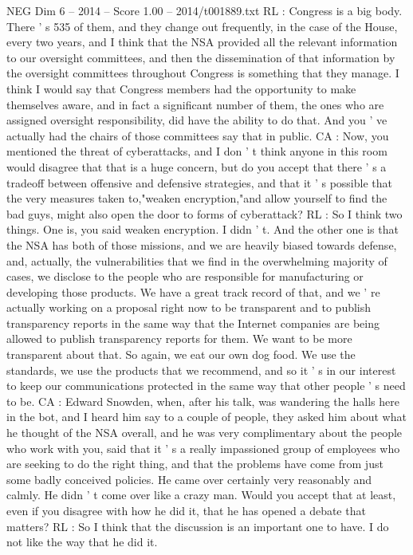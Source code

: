 \begin{textsample}{NEG Dim 6 – 2014 – Score 1.00 – 2014/t001889.txt}
RL : Congress is a big body.
There ' s 535 of them, and they change out frequently, in the case of the House, every two years, and I think that the NSA provided all the relevant information to our oversight committees, and then the dissemination of that information by the oversight committees throughout Congress is something that they manage.
I think I would say that Congress members had the opportunity to make themselves aware, and in fact a significant number of them, the ones who are assigned oversight responsibility, did have the ability to do that.
And you ' ve actually had the chairs of those committees say that in public.
CA : Now, you mentioned the threat of cyberattacks, and I don ' t think anyone in this room would disagree that that is a huge concern, but do you accept that there ' s a tradeoff between offensive and defensive strategies, and that it ' s possible that the very measures taken to,"weaken encryption,"and allow yourself to find the bad guys, might also open the door to forms of cyberattack?
RL : So I think two things.
One is, you said weaken encryption.
I didn ' t.
And the other one is that the NSA has both of those missions, and we are heavily biased towards defense, and, actually, the vulnerabilities that we find in the overwhelming majority of cases, we disclose to the people who are responsible for manufacturing or developing those products.
We have a great track record of that, and we ' re actually working on a proposal right now to be transparent and to publish transparency reports in the same way that the Internet companies are being allowed to publish transparency reports for them.
We want to be more transparent about that.
So again, we eat our own dog food.
We use the standards, we use the products that we recommend, and so it ' s in our interest to keep our communications protected in the same way that other people ' s need to be.
CA : Edward Snowden, when, after his talk, was wandering the halls here in the bot, and I heard him say to a couple of people, they asked him about what he thought of the NSA overall, and he was very complimentary about the people who work with you, said that it ' s a really impassioned group of employees who are seeking to do the right thing, and that the problems have come from just some badly conceived policies.
He came over certainly very reasonably and calmly.
He didn ' t come over like a crazy man.
Would you accept that at least, even if you disagree with how he did it, that he has opened a debate that matters?
RL : So I think that the discussion is an important one to have.
I do not like the way that he did it.

\end{textsample}
